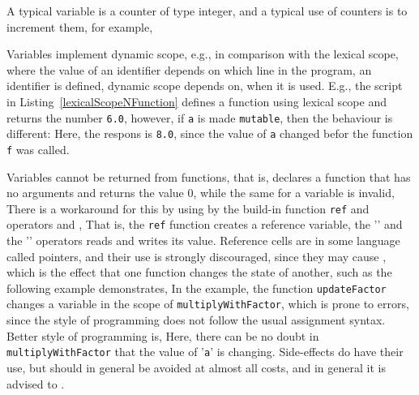 A typical variable is a counter of type integer, and a typical use of counters is to increment them, for example,
%
%
\begin{comment}
  A function that elegantly implements the incrementation operation may be constructed as,
  \fs{mutableAssignIncrementEncapsulation}{}
  \jon{Explain why this works!} Here, the output of \texttt{incr} is an anonymous function, that takes no argument, increments the variable of \texttt{incr} and returns the new value of the counter. This construction is called \idx{encapsulation}, since the variable \texttt{counter} is hidden by the function \texttt{incr} from the user, i.e., the user need not be concerned with how the increment operator is implemented and the variable name used by \texttt{incr} does not clutter the scope where it is used.
\end{comment}
Variables implement dynamic scope, e.g., in comparison with the lexical scope, where the value of an identifier depends on which line in the program, an identifier is defined, dynamic scope depends on, when it is used. E.g., the script in Listing~\ref{lexicalScopeNFunction} defines a function using lexical scope and returns the number \lstinline!6.0!, however, if \lstinline!a! is made \lstinline!mutable!, then the behaviour is different:
%
%
Here, the respons is \lstinline!8.0!, since the value of \lstinline!a! changed befor the function \lstinline!f! was called.
 
Variables cannot be returned from functions, that is,
%
%
declares a function that has no arguments and returns the value 0, while the same for a variable is invalid,
%
%
There is a workaround for this by using  by the build-in function \texttt{ref} and operators \lexeme{!} and \lexeme{:=},
%
%
That is, the \texttt{ref} function creates a reference variable, the '\lexeme{!}' and the '\lexeme{:=}' operators reads and writes its value. Reference cells are in some language called pointers, and their use is strongly discouraged, since they may cause , which is the effect that one function changes the state of another, such as the following example demonstrates,
%
%
In the example, the function \texttt{updateFactor} changes a variable in the scope of \texttt{multiplyWithFactor}, which is prone to errors, since the style of programming does not follow the usual assignment syntax. Better style of programming is,
%
%
Here, there can be no doubt in \texttt{multiplyWithFactor} that the value of '\texttt{a}' is changing. Side-effects do have their use, but should in general be avoided at almost all costs, and in general it is advised to .


